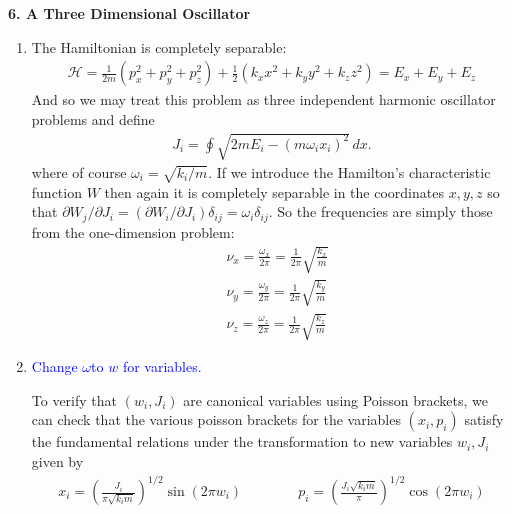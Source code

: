 \documentclass{article}
\theoremstyle{definition}
\newcommand{\p}{\partial}
\newcommand{\ham}{\mathcal{H}}
\newcommand{\f}[2]{\frac{#1}{#2}}
\newcommand{\lp}{\left(}
\newcommand{\rp}{\right)}
\begin{document}
\noindent \textbf{6. A Three Dimensional Oscillator}

\begin{enumerate}[label=(\alph*)]
	\item The Hamiltonian is completely separable:
	\begin{align*}
	\ham = \f{1}{2m}(p_x^2 + p_y^2 + p_z^2) + \f{1}{2}(k_xx^2 + k_y y^2 + k_z z^2) = E_x + E_y + E_z
	\end{align*}
	And so we may treat this problem as three independent harmonic oscillator problems and define 
	\begin{align*}
	J_i = \oint \sqrt{2mE_i - (m\omega_i x_i)^2}\,dx.
	\end{align*}
	where of course $\omega_i = \sqrt{k_i/m}$. If we introduce the Hamilton's characteristic function $W$ then again it is completely separable in the coordinates $x,y,z$ so that $\p W_j/\p J_i = (\p W_i/\p J_i) \delta_{ij} = \omega_i \delta_{ij}$. So the frequencies are simply those from the one-dimension problem:
	\begin{align*}
	&\nu_x =  \f{\omega_x}{2\pi} = \f{1}{2\pi}\sqrt{\f{k_x}{m}}\\
	&\nu_y =  \f{\omega_y}{2\pi} = \f{1}{2\pi}\sqrt{\f{k_y}{m}}\\
	&\nu_z =  \f{\omega_z}{2\pi} = \f{1}{2\pi}\sqrt{\f{k_z}{m}}
	\end{align*} 
	
	
	\item \textcolor{blue}{Change $\omega$to $w$ for variables.}
	
	To verify that $(w_i,J_i)$ are canonical variables using Poisson brackets, we can check that the various poisson brackets for the variables $(x_i,p_i)$ satisfy the fundamental relations under the transformation to new variables $w_i,J_i$ given by 
	\begin{align*}
	x_i = \lp \f{J_i}{\pi \sqrt{k_im }}\rp^{1/2}\sin(2\pi w_i) \quad\quad\quad\quad 
	p_i = \lp \f{J_i\sqrt{k_im}}{\pi} \rp^{1/2} \cos (2\pi w_i) 
	\end{align*}
	
	
	

\end{enumerate}
\end{document}
